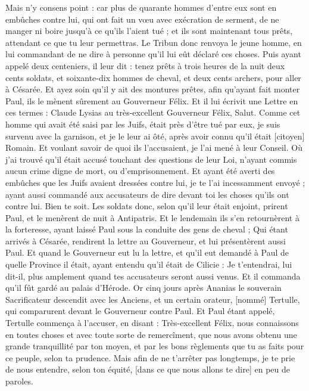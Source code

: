 \begin{multicols}{2}
Mais n'y consens point : car plus de quarante hommes d'entre eux sont en embûches contre lui, qui ont fait un vœu avec exécration de serment, de ne manger ni boire jusqu'à ce qu'ils l'aient tué ; et ils sont maintenant tous prêts, attendant ce que tu leur permettras.
Le Tribun donc renvoya le jeune homme, en lui commandant de ne dire à personne qu'il lui eût déclaré ces choses.
Puis ayant appelé deux centeniers, il leur dit : tenez prêts à trois heures de la nuit deux cents soldats, et soixante-dix hommes de cheval, et deux cents archers, pour aller à Césarée.
Et ayez soin qu'il y ait des montures prêtes, afin qu'ayant fait monter Paul, ils le mènent sûrement au Gouverneur Félix.
Et il lui écrivit une Lettre en ces termes :
Claude Lysias au très-excellent Gouverneur Félix, Salut.
Comme cet homme qui avait été saisi par les Juifs, était près d'être tué par eux, je suis survenu avec la garnison, et je le leur ai ôté, après avoir connu qu'il était [citoyen] Romain.
Et voulant savoir de quoi ils l'accusaient, je l'ai mené à leur Conseil.
Où j'ai trouvé qu'il était accusé touchant des questions de leur Loi, n'ayant commis aucun crime digne de mort, ou d'emprisonnement.
Et ayant été averti des embûches que les Juifs avaient dressées contre lui, je te l'ai incessamment envoyé ; ayant aussi commandé aux accusateurs de dire devant toi les choses qu'ils ont contre lui. Bien te soit.
Les soldats donc, selon qu'il leur était enjoint, prirent Paul, et le menèrent de nuit à Antipatris.
Et le lendemain ils s'en retournèrent à la forteresse, ayant laissé Paul sous la conduite des gens de cheval ;
Qui étant arrivés à Césarée, rendirent la lettre au Gouverneur, et lui présentèrent aussi Paul.
Et quand le Gouverneur eut lu la lettre, et qu'il eut demandé à Paul de quelle Province il était, ayant entendu qu'il était de Cilicie :
Je t'entendrai, lui dit-il, plus amplement quand tes accusateurs seront aussi venus. Et il commanda qu'il fût gardé au palais d'Hérode.
\VerseOne{}Or cinq jours après Ananias le souverain Sacrificateur descendit avec les Anciens, et un certain orateur, [nommé] Tertulle, qui comparurent devant le Gouverneur contre Paul.
Et Paul étant appelé, Tertulle commença à l'accuser, en disant :
Très-excellent Félix, nous connaissons en toutes choses et avec toute sorte de remercîment, que nous avons obtenu une grande tranquillité par ton moyen, et par les bons règlements que tu as faits pour ce peuple, selon ta prudence.
Mais afin de ne t'arrêter pas longtemps, je te prie de nous entendre, selon ton équité, [dans ce que nous allons te dire] en peu de paroles.

\end{multicols}
